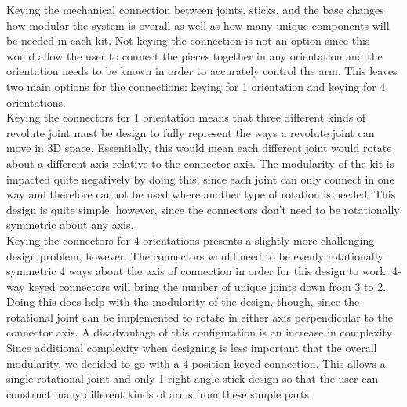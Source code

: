 Keying the mechanical connection between joints, sticks, and the base changes how modular the system is overall as well as how many unique components will be needed in each kit. Not keying the connection is not an option since this would allow the user to connect the pieces together in any orientation and the orientation needs to be known in order to accurately control the arm. This leaves two main options for the connections: keying for 1 orientation and keying for 4 orientations.\\
\newline
Keying the connectors for 1 orientation means that three different kinds of revolute joint must be design to fully represent the ways a revolute joint can move in 3D space. Essentially, this would mean each different joint would rotate about a different axis relative to the connector axis. The modularity of the kit is impacted quite negatively by doing this, since each joint can only connect in one way and therefore cannot be used where another type of rotation is needed. This design is quite simple, however, since the connectors don't need to be rotationally symmetric about any axis. \\
\newline
Keying the connectors for 4 orientations presents a slightly more challenging design problem, however. The connectors would need to be evenly rotationally symmetric 4 ways about the axis of connection in order for this design to work. 4-way keyed connectors will bring the number of unique joints down from 3 to 2. Doing this does help with the modularity of the design, though, since the rotational joint can be implemented to rotate in either axis perpendicular to the connector axis. A disadvantage of this configuration is an increase in complexity. \\
\newline
Since additional complexity when designing is less important that the overall modularity, we decided to go with a 4-position keyed connection. This allows a single rotational joint and only 1 right angle stick design so that the user can construct many different kinds of arms from these simple parts.

